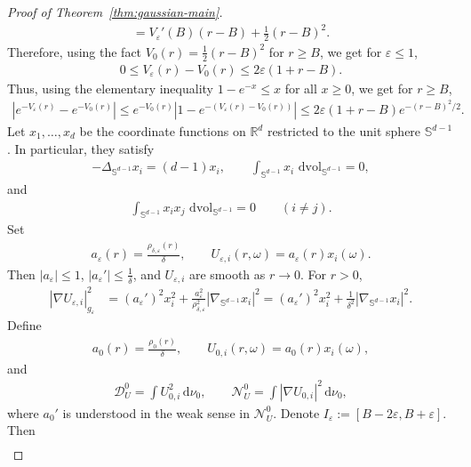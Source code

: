 \documentclass[11pt,reqno]{amsart}
\numberwithin{equation}{section}
\theoremstyle{definition}
\theoremstyle{remark}
\newcommand{\ud}{\mathrm{d}}
\newcommand{\0}{\emptyset}
\newcommand{\veps}{\varepsilon}
\newcommand{\bbR}{\mathbb R}
\newcommand{\bbS}{\mathbb S}
\newcommand{\calD}{\mathcal D}
\newcommand{\calN}{\mathcal N}
\newcommand{\dvol}{\,\mathrm{dvol}}
\begin{document}
\begin{proof}[Proof of Theorem~\ref{thm:gaussian-main}]
\begin{align}
        =
        V_\veps'(B)(r-B)+\frac{1}{2}(r-B)^2.
\end{align}
Therefore, using the fact \(V_0(r)=\frac{1}{2}(r-B)^2\) for \(r\geq B\), we get
for \(\veps\leq1\),
\begin{align}
        0\leq V_\veps(r)-V_0(r)
        \leq
        2\veps(1+r-B).
\end{align}
Thus, using the elementary inequality \(1-e^{-x}\leq x\) for all \(x\geq0\), we
get for \(r\geq B\),
\begin{align}\label{eq:end-density-error}
        \left|e^{-V_\veps(r)}-e^{-V_0(r)}\right|
        \leq e^{-V_0(r)} |1-e^{-(V_\veps(r)-V_0(r))}|
        \leq
        2\veps(1+r-B)e^{-(r-B)^2/2}.
\end{align}
Let \(x_1,\dots,x_d\) be the coordinate functions on \(\bbR^d\) restricted to the
unit sphere \(\bbS^{d-1}\). In particular, they satisfy
\begin{align}
        -\Delta_{\bbS^{d-1}}x_i=(d-1)x_i,
        \qquad
        \int_{\bbS^{d-1}}x_i\,\dvol_{\bbS^{d-1}}=0,
\end{align}
and
\begin{align}
        \int_{\bbS^{d-1}}x_ix_j\,\dvol_{\bbS^{d-1}}=0
        \qquad(i\neq j).
\end{align}
Set
\begin{align}
        a_\veps(r)=\frac{\rho_{\delta,\veps}(r)}{\delta},
        \qquad
        U_{\veps,i}(r,\omega)=a_\veps(r)x_i(\omega).
\end{align}
Then \(|a_\veps|\leq1\), \(|a_\veps'|\leq\frac1\delta\), and \(U_{\veps,i}\)
are smooth as \(r\to0\). For \(r>0\),
\begin{align}
        |\nabla U_{\veps,i}|_{g_\veps}^2
        &=
        (a_\veps')^2x_i^2
        +
        \frac{a_\veps^2}{\rho_{\delta,\veps}^2}
        |\nabla_{\bbS^{d-1}}x_i|^2=
        (a_\veps')^2x_i^2
        +
        \frac{1}{\delta^2}|\nabla_{\bbS^{d-1}}x_i|^2.
\end{align}
Define
\begin{align}
        a_0(r)=\frac{\rho_0(r)}{\delta},
        \qquad
        U_{0,i}(r,\omega)=a_0(r)x_i(\omega),
\end{align}
and
\begin{align}
        \calD_U^0=\int U_{0,i}^2\,\ud\nu_0,
        \qquad
        \calN_U^0=\int |\nabla U_{0,i}|^2\,\ud\nu_0,
\end{align}
where \(a_0'\) is understood in the weak sense in \(\calN_U^0\). Denote \(I_\veps:=[B-2\veps,B+\veps]\). Then 
\begin{align}\label{eq:angular-error-estimate-new}

\end{align}
\end{proof}
\end{document}
